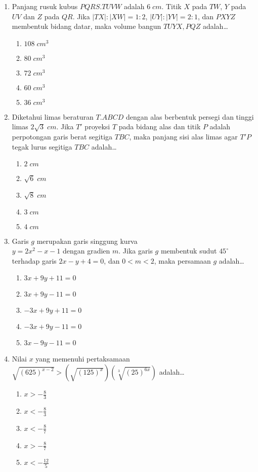 \documentclass[A4,12PT, english, twocolumn]{journal}
\begin{document}
\begin{enumerate}
\item Panjang rusuk kubus $PQRS.TUVW$ adalah $6 \; cm$. Titik $X$ pada $TW$, $Y$ pada $UV$ dan $Z$ pada $QR$. Jika $|TX|:|XW|=1:2$, $|UY|:|YV|=2:1$, dan $PXYZ$ membentuk bidang datar, maka volume bangun $TUYX,PQZ$ adalah\dots
    \begin{enumerate}
        \item $108 \; cm^3$
        \item $80 \; cm^3$
        \item $72 \; cm^3$
        \item $60 \; cm^3$
        \item $36 \; cm^3$
    \end{enumerate}

\item Diketahui limas beraturan $T.ABCD$ dengan alas berbentuk persegi dan tinggi limas $2\sqrt{3} \; cm$. Jika $T'$ proyeksi $T$ pada bidang alas dan titik $P$ adalah perpotongan garis berat segitiga $TBC$, maka panjang sisi alas limas agar $T' P$ tegak lurus segitiga $TBC$ adalah\dots
    \begin{enumerate}
        \item $2 \; cm$
        \item $\sqrt{6} \; cm$
        \item $\sqrt{8} \; cm$
        \item $3 \; cm$
        \item $4 \; cm$
    \end{enumerate}

\item Garis $g$ merupakan garis singgung kurva \\ $y=2x^2-x-1$ dengan gradien $m$. Jika garis $g$ membentuk sudut $45^\circ$ terhadap garis $2x-y+4=0$, dan $0<m<2$, maka persamaan $g$ adalah\dots
    \begin{enumerate}
        \item $3x+9y+11=0$
        \item $3x+9y-11=0$
        \item $-3x+9y+11=0$
        \item $-3x+9y-11=0$
        \item $3x-9y-11=0$
    \end{enumerate}

\item Nilai $x$ yang memenuhi pertaksamaan \\ $\sqrt{(625)^{x-2}}>\left(\sqrt{(125)^x} \right)\left(\sqrt[3]{(25)^{6x}} \right)$ adalah\dots
    \begin{enumerate}
        \item $x>-\frac{8}{3}$
        \item $x<-\frac{8}{3}$
        \item $x<-\frac{8}{7}$
        \item $x>-\frac{8}{7}$
        \item $x<-\frac{12}{5}$
    \end{enumerate}


\end{enumerate}
\end{document}
